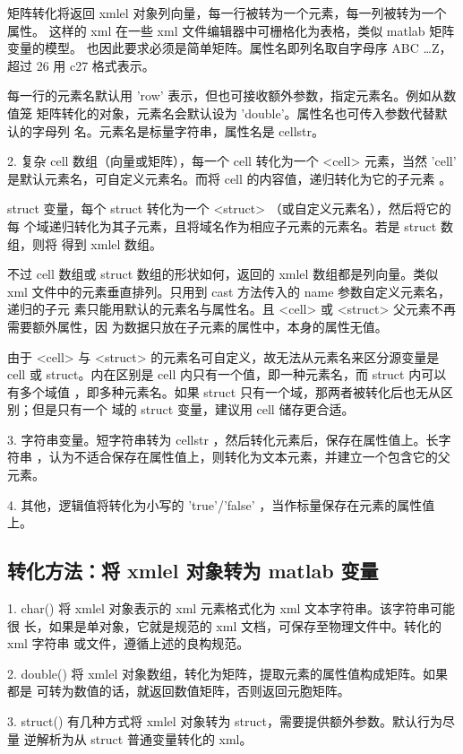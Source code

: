 矩阵转化将返回 xmlel 对象列向量，每一行被转为一个元素，每一列被转为一个属性。
这样的 xml 在一些 xml 文件编辑器中可栅格化为表格，类似 matlab 矩阵变量的模型。
也因此要求必须是简单矩阵。属性名即列名取自字母序 ABC \ldots Z，超过 26 用 c27
格式表示。

每一行的元素名默认用 'row' 表示，但也可接收额外参数，指定元素名。例如从数值笼
矩阵转化的对象，元素名会默认设为 'double'。属性名也可传入参数代替默认的字母列
名。元素名是标量字符串，属性名是 cellstr。

2. 复杂 cell 数组（向量或矩阵），每一个 cell 转化为一个 <cell> 元素，当然
'cell' 是默认元素名，可自定义元素名。而将 cell 的内容值，递归转化为它的子元素
。

struct 变量，每个 struct 转化为一个 <struct> （或自定义元素名），然后将它的每
个域递归转化为其子元素，且将域名作为相应子元素的元素名。若是 struct 数组，则将
得到 xmlel 数组。

不过 cell 数组或 struct 数组的形状如何，返回的 xmlel 数组都是列向量。类似 xml
文件中的元素垂直排列。只用到 cast 方法传入的 name 参数自定义元素名，递归的子元
素只能用默认的元素名与属性名。且 <cell> 或 <struct> 父元素不再需要额外属性，因
为数据只放在子元素的属性中，本身的属性无值。

由于 <cell> 与 <struct> 的元素名可自定义，故无法从元素名来区分源变量是 cell 或
struct。内在区别是 cell 内只有一个值，即一种元素名，而 struct 内可以有多个域值
，即多种元素名。如果 struct 只有一个域，那两者被转化后也无从区别；但是只有一个
域的 struct 变量，建议用 cell 储存更合适。

3. 字符串变量。短字符串转为 cellstr ，然后转化元素后，保存在属性值上。长字符串
，认为不适合保存在属性值上，则转化为文本元素，并建立一个包含它的父元素。

4. 其他，逻辑值将转化为小写的 'true'/'false' ，当作标量保存在元素的属性值上。

\subsection{转化方法：将 xmlel 对象转为 matlab 变量}

1. char() 将 xmlel 对象表示的 xml 元素格式化为 xml 文本字符串。该字符串可能很
长，如果是单对象，它就是规范的 xml 文档，可保存至物理文件中。转化的 xml 字符串
或文件，遵循上述的良构规范。

2. double() 将 xmlel 对象数组，转化为矩阵，提取元素的属性值构成矩阵。如果都是
可转为数值的话，就返回数值矩阵，否则返回元胞矩阵。

3. struct() 有几种方式将 xmlel 对象转为 struct，需要提供额外参数。默认行为尽量
逆解析为从 struct 普通变量转化的 xml。

